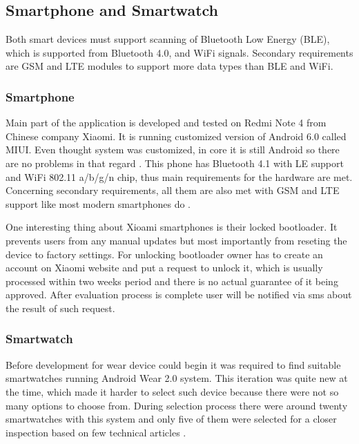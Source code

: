\subsection{Smartphone and Smartwatch}\label{subsec:SmartphoneAndSmartWatch}
Both smart devices must support scanning of Bluetooth Low Energy (BLE), which is supported from Bluetooth 4.0, and WiFi signals. Secondary requirements are GSM and LTE modules to support more data types than BLE and WiFi.

\subsubsection{Smartphone}\label{subsubsec:Smartphone}
Main part of the application is developed and tested on Redmi Note 4 from Chinese company Xiaomi. It is running customized version of Android 6.0 called MIUI. Even thought system was customized, in core it is still Android so there are no problems in that regard \cite{XRN4LTE}. This phone has Bluetooth 4.1 with LE support and WiFi 802.11 a/b/g/n chip, thus main requirements for the hardware are met. Concerning secondary requirements, all them are also met with GSM and LTE support like most modern smartphones do \cite{XRN4FPS}.

One interesting thing about Xioami smartphones is their locked bootloader. It prevents users from any manual updates but most importantly from reseting the device to factory settings. For unlocking bootloader owner has to create an account on Xiaomi website and put a request to unlock it, which is usually processed within two weeks period and there is no actual guarantee of it being approved. After evaluation process is complete user will be notified via sms about the result of such request.

\subsubsection{Smartwatch}\label{subsubsec:Smartwatch}
Before development for wear device could begin it was required to find suitable smartwatches running Android Wear 2.0 system. This iteration was quite new at the time, which made it harder to select such device because there were not so many options to choose from. During selection process there were around twenty smartwatches with this system and only five of them were selected for a closer inspection based on few technical articles \cite{BAWW, BAWW18, BAWW17}.

